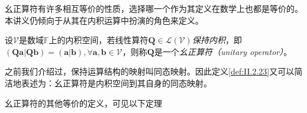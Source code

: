 \documentclass[main.tex]{subfiles}
\begin{document}
幺正算符有许多相互等价的性质，选择哪一个作为其定义在数学上也都是等价的。本讲义仍倾向于从其在内积运算中扮演的角色来定义。

\begin{definition}[幺正算符]\label{def:II.2.23}
    设$\mathcal{V}$是数域$\mathbb{F}$上的内积空间，若线性算符$\mathbf{Q}\in\mathcal{L}\left(\mathcal{V}\right)$\emph{保持内积}，即$\left(\mathbf{Qa}|\mathbf{Qb}\right)=\left(\mathbf{a}|\mathbf{b}\right),\forall\mathbf{a},\mathbf{b}\in\mathcal{V}$，则称$\mathbf{Q}$是一个\emph{幺正算符（unitary operator）}。
\end{definition}

之前我们介绍过，保持运算结构的映射叫同态映射。因此定义\ref{def:II.2.23}又可以简洁地表述为：幺正算符是内积空间到其自身的同态映射。

幺正算符的其他等价的定义，可见以下定理
\end{document}
